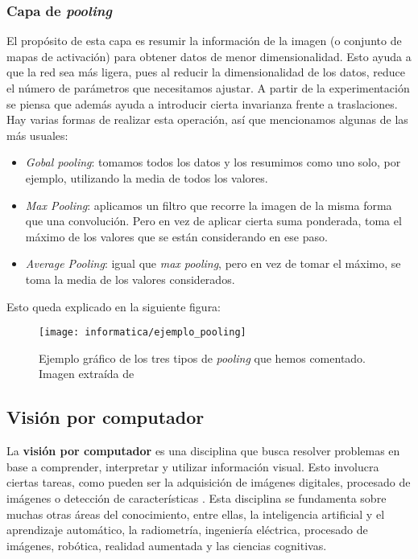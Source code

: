 \subsubsection{Capa de \textit{pooling}}

El propósito de esta capa es resumir la información de la imagen (o conjunto de mapas de activación) para obtener datos de menor dimensionalidad. Esto ayuda a que la red sea más ligera, pues al reducir la dimensionalidad de los datos, reduce el número de parámetros que necesitamos ajustar. A partir de la experimentación se piensa que además ayuda a introducir cierta invarianza frente a traslaciones. Hay varias formas de realizar esta operación, así que mencionamos algunas de las más usuales:

\begin{itemize}
    \item \textit{Gobal pooling}: tomamos todos los datos y los resumimos como uno solo, por ejemplo, utilizando la media de todos los valores.
    \item \textit{Max Pooling}: aplicamos un filtro que recorre la imagen de la misma forma que una convolución. Pero en vez de aplicar cierta suma ponderada, toma el máximo de los valores que se están considerando en ese paso.
    \item \textit{Average Pooling}: igual que \textit{max pooling}, pero en vez de tomar el máximo, se toma la media de los valores considerados.
\end{itemize}

Esto queda explicado en la siguiente figura:

\begin{figure}[H]
    \centering
    \texttt{[image: informatica/ejemplo\_pooling]}
    \caption{Ejemplo gráfico de los tres tipos de \textit{pooling} que hemos comentado. Imagen extraída de \cite{informatica:paper_definicion_cnn}}
\end{figure}

\subsection{Visión por computador}

La \textbf{visión por computador} es una disciplina que busca resolver problemas en base a comprender, interpretar y utilizar información visual. Esto involucra ciertas tareas, como pueden ser la adquisición de imágenes digitales, procesado de imágenes o detección de características \cite{informatica:cv_modern_approach}. Esta disciplina se fundamenta sobre muchas otras áreas del conocimiento, entre ellas, la inteligencia artificial y el aprendizaje automático, la radiometría, ingeniería eléctrica, procesado de imágenes, robótica, realidad aumentada y las ciencias cognitivas.

